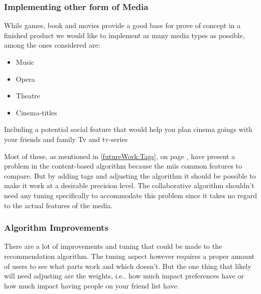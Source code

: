 \subsubsection{Implementing other form of Media}
While games, book and movies provide a good base for prove of concept in a finished product we would like to implement as many media types as possible, among the ones considered are:
\begin{itemize}
\item Music
\item Opera
\item Theatre
\item Cinema-titles
\end{itemize}

Including a potential social feature that would help you plan cinema goings with your friends and family
Tv and tv-series

Most of these, as mentioned in \ref{futureWork:Tags}, on page \pageref{futureWork:Tags}, have present a problem in the content-based algorithm because the miis common features to compare. But by adding tags and adjusting the algorithm it should be possible to make it work at a desirable precision level. The collaborative algorithm shouldn’t need any tuning specifically to accommodate this problem since it takes no regard to the actual features of the media.

\subsubsection{Algorithm Improvements}
There are a lot of improvements and tuning that could be made to the recommendation algorithm. The tuning aspect however requires a proper amount of users to see what parts work and which doesn't. But the one thing that likely will need adjusting are the weights, i.e.. how much impact preferences have or how much impact having people on your friend list have.


